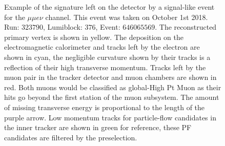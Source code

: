\begin{figure}
  \caption{Example of the signature left on the detector by a signal-like event
    for the $\mu\mu e \nu$ channel. This event was taken on October 1st 2018.
    Run: $323790$, Lumiblock: $376$, Event: $646065569$. The reconstructed primary vertex is shown in yellow.
    The deposition on the electromagnetic calorimeter and tracks left by the electron are shown in cyan,
    the negligible curvature shown by their tracks is a reflection of their high transverse momentum.
    Tracks left by the muon pair in the tracker detector and muon chambers are shown in red.
    Both muons would be classified as global-High Pt Muon as their hits
    go beyond the first station of the muon subsystem. The amount of missing
    transverse energy is proportional to the length of the purple arrow. Low momentum
    tracks for particle-flow candidates in the inner tracker are shown in green for
    reference, these PF candidates are filtered by the preselection. }
  \label{fig:Fireworks_mumuev}
\end{figure}

